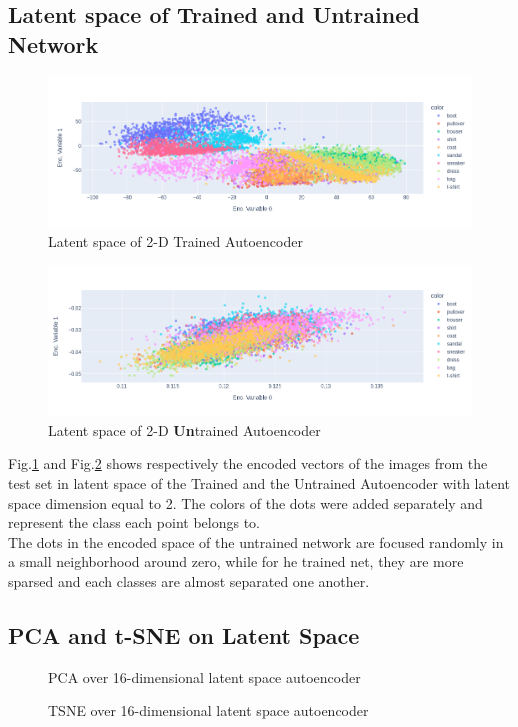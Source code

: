 \documentclass[11pt,a4paper,twocolumn]{IEEEtran}
\begin{document}
	\subsection{Latent space of Trained and Untrained Network}
		\begin{figure}[h]
			\centering
			\includegraphics[width=1\linewidth]{../imgs/newplot}
			\caption{Latent space of 2-D Trained Autoencoder}
			\label{fig:lspace_tr}
		\end{figure}
		\begin{figure}[h]
			\centering
			\includegraphics[width=1\linewidth]{../imgs/newplot(1)}
			\caption{Latent space of 2-D \textbf{Un}trained Autoencoder}
			\label{fig:lspace_un}
		\end{figure}
	Fig.\ref{fig:lspace_tr} and Fig.\ref{fig:lspace_un} shows respectively the encoded vectors of the images from the test set in latent space of the Trained and the Untrained Autoencoder with latent space dimension equal to 2. The colors of the dots were added separately and represent the class each point belongs to.\\
	The dots in the encoded space of the untrained network are focused randomly in a small neighborhood around zero, while for he trained net, they are more sparsed and each classes are almost separated one another.
	\newpage
	 \subsection{PCA and t-SNE on Latent Space}
	 \begin{figure}[h]
	 	\centering
	 	
	 	\caption{PCA over 16-dimensional latent space autoencoder}
	 	\label{fig:psa}
	 \end{figure}
	 \begin{figure}[h]
	 	\centering
	 	
	 	\caption{TSNE over 16-dimensional latent space autoencoder}
	 	\label{fig:tsne}
	 \end{figure}\newpage
\end{document}
